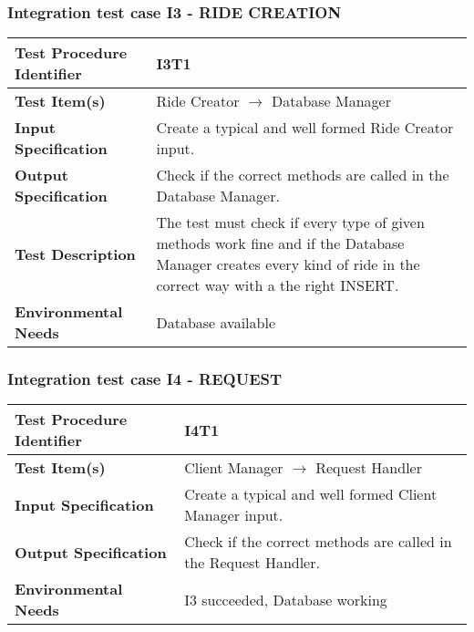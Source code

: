 \hfill \newline \newline 
\subsubsection{Integration test case I3 - RIDE CREATION }
 \begin{tabular}{l p{}}
    \hline
    \textbf{Test Procedure Identifier} & I3T1 \\
    \hline
    \textbf{Test Item(s)} & Ride Creator	  $\rightarrow$ Database Manager\\
    \hline
    \textbf{Input Specification} &  Create a typical and well formed Ride Creator input.  \\
    \hline
    \textbf{Output Specification} & Check if the correct methods are called in the Database Manager.\\
    \hline
    \textbf{Test Description} &  The test must check if every type of given methods work fine and if the Database Manager creates every kind of ride in the correct way with a the right INSERT.\\
    \hline
    \textbf{Environmental Needs} &  Database available\\
    \hline
    \end{tabular}

\hfill \newline \newline 
\subsubsection{Integration test case I4 - REQUEST}
 \begin{tabular}{l p{}}
    \hline
    \textbf{Test Procedure Identifier} & I4T1 \\
    \hline
    \textbf{Test Item(s)} & Client Manager $\rightarrow$ Request Handler \\
    \hline
    \textbf{Input Specification} & Create a typical and well formed Client Manager input.  \\
    \hline
    \textbf{Output Specification} & Check if the correct methods are called in the Request Handler. \\
    \hline
    \textbf{Environmental Needs} & I3 succeeded, Database working\\
    \hline
    \end{tabular}
\hfill \newline \newline 
